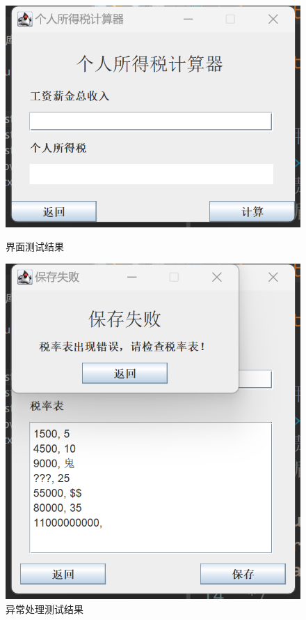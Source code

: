 \documentclass[a4paper, utf8]{ctexart}
\begin{document}
    \begin{figure}[htbp]
        \begin{minipage}{.5\linewidth}
            \centering
            \vspace{.03\textheight}
            \includegraphics[height=0.15\textheight]{figure/GUITest.jpg}
            \vspace{.03\textheight}
            \caption{界面测试结果}
        \end{minipage}
        \begin{minipage}{.5\linewidth}
            \centering
            \includegraphics[height=0.21\textheight]{figure/ExceptionTest.png}
            \caption{异常处理测试结果}
        \end{minipage}
    \end{figure}
\end{document}
